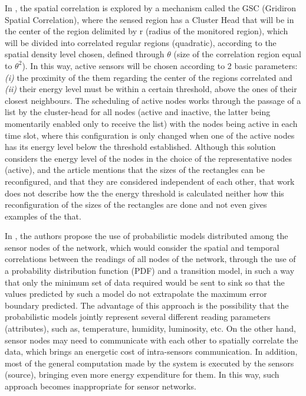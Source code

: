 \documentclass[conference]{IEEEtran}
\begin{document}
In \cite{Shah2007}, the spatial correlation is explored by a mechanism called
the GSC (Gridiron Spatial Correlation), where the sensed region has a Cluster
Head that will be in the center of the region delimited by r (radius of the
monitored region), which will be divided into correlated regular regions
(quadratic), according to the spatial density level chosen, defined through
$\theta$ (size of the correlation region equal to $\theta^2$). In this way,
active sensors will be chosen according to 2 basic parameters: {\it (i)} the
proximity of the them regarding the center of the regions correlated and {\it
(ii)} their energy level must be within a certain threshold, above the ones of
their closest neighbours. The scheduling of active nodes works through the
passage of a list by the cluster-head for all nodes (active and inactive, the
latter being momentarily enabled only to receive the list) with the nodes being
active in each time slot, where this configuration is only changed when one of
the active nodes has its energy level below the threshold established. Although
this solution considers the energy level of the nodes in the choice of the
representative nodes (active), and the article mentions that the sizes of the
rectangles can be reconfigured, and that they are considered independent of each
other, that work does not describe how the the energy threshold is calculated
neither how this reconfiguration of the sizes of the rectangles are done and not
even gives examples of the that.

In \cite{Chu2006}, the authors propose the use of probabilistic models
distributed among the sensor nodes of the network, which would consider the
spatial and temporal correlations between the readings of all nodes of the
network, through the use of a probability distribution function (PDF) and a
transition model, in such a way that only the minimum set of data required would
be sent to sink so that the values predicted by such a model do not extrapolate
the maximum error boundary predicted. The advantage of this approach is the
possibility that the probabilistic models jointly represent several different
reading parameters (attributes), such as, temperature, humidity, luminosity,
etc. On the other hand, sensor nodes may need to communicate with each other to
spatially correlate the data, which brings an energetic cost of intra-sensors
communication. In addition, most of the general computation made by the system
is executed by the sensors (source), bringing even more energy expenditure for
them. In this way, such approach becomes inappropriate for sensor networks.
\end{document}
